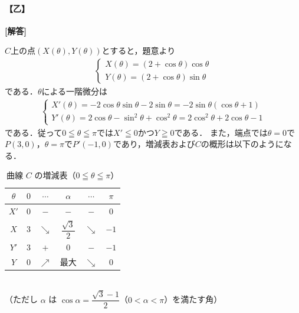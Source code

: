 \documentclass[../../main.tex]{subfiles}
\begin{document}
\begin{oframed}
  
\end{oframed}

\paragraph{【乙】}

{\bf [解答]}

$C$上の点$(X(\theta),Y(\theta))$とすると，題意より
\begin{align}
  \begin{cases}
    X(\theta)=(2+\cos\theta)\cos\theta \\
    Y(\theta)=(2+\cos\theta)\sin\theta
  \end{cases} \label{eq:1}
\end{align}
である．$\theta$による一階微分は
\begin{align}
  \begin{cases}
    X'(\theta)=-2\cos\theta\sin\theta-2\sin\theta=-2\sin\theta(\cos\theta+1) \\
    Y'(\theta)=2\cos\theta-\sin^2\theta+\cos^2\theta = 2\cos^2\theta+2\cos\theta-1
  \end{cases} \label{eq:2}
\end{align}
である．従って$0\leqq\theta\leqq\pi$では$X'\leqq0$かつ$Y\geqq0$である．
また，端点では$\theta=0$で$P(3,0)$，$\theta=\pi$で$P'(-1,0)$であり，増減表および$C$の概形は以下のようになる．

\begin{table}[htb]
  \centering
  \caption{曲線 $C$ の増減表（$0\leqq\theta\leqq\pi$）}
  \label{tab:curve_C}
  \begin{tabular}{c|ccccc}
    $\theta$ & $0$ & $\cdots$ & $\alpha$ & $\cdots$ & $\pi$ \\
    \hline
    $X'$ & $0$ & $-$ & $-$ & $-$ & $0$ \\
    \hline
    $X$ & $3$ & $\searrow$ & $\dfrac{\sqrt{3}}{2}$ & $\searrow$ & $-1$ \\
    \hline
    $Y'$ & $3$ & $+$ & $0$ & $-$ & $-1$ \\
    \hline
    $Y$ & $0$ & $\nearrow$ & 最大 & $\searrow$ & $0$
  \end{tabular}
  \\[2pt]
  \footnotesize（ただし $\alpha$ は $\cos\alpha = \dfrac{\sqrt{3}-1}{2}$（$0<\alpha<\pi$）を満たす角）
\end{table}
\end{document}
